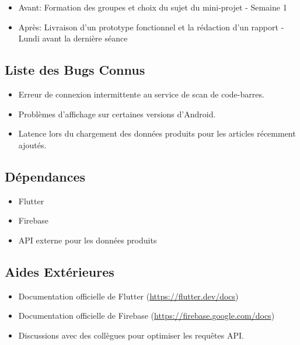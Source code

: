 \documentclass[11pt]{article}
\begin{document}
\begin{itemize}
    \item Avant: Formation des groupes et choix du sujet du mini-projet - Semaine 1
    \item Après: Livraison d’un prototype fonctionnel et la rédaction d’un rapport - Lundi avant la dernière séance
\end{itemize}

\subsection{Liste des Bugs Connus}

\begin{itemize}
    \item Erreur de connexion intermittente au service de scan de code-barres.
    \item Problèmes d'affichage sur certaines versions d'Android.
    \item Latence lors du chargement des données produits pour les articles récemment ajoutés.
\end{itemize}

\subsection{Dépendances}

\begin{itemize}
    \item Flutter
    \item Firebase
    \item API externe pour les données produits
\end{itemize}

\subsection{Aides Extérieures}

\begin{itemize}
    \item Documentation officielle de Flutter (\url{https://flutter.dev/docs})
    \item Documentation officielle de Firebase (\url{https://firebase.google.com/docs})
    \item Discussions avec des collègues pour optimiser les requêtes API.
\end{itemize}
\end{document}
